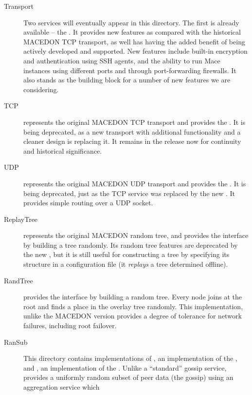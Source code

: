 \begin{description}
\item[Transport] Two  services will eventually
  appear in this directory.  The first is already available -- the .
  It provides new features as compared with the historical MACEDON TCP transport,
  as well has having the added benefit of being actively developed and supported.
  New features include built-in encryption and authentication using SSH agents, and 
  the ability to run Mace instances using different ports and through port-forwarding
  firewalls.  It also stands as the building block for a number of new features 
  we are considering.
\item[TCP]  represents the original MACEDON TCP transport and 
  provides the .  It is being deprecated, as a new 
  transport with additional functionality and a cleaner design is replacing it.
  It remains in the release now for continuity and historical significance.
\item[UDP]  represents the original MACEDON UDP transport and 
  provides the .  It is being deprecated, just as
  the TCP service was replaced by the new .  It
  provides simple routing over a UDP socket.
\item[ReplayTree]  represents the original MACEDON random tree,
  and provides the  interface by building a tree 
  randomly.  Its random tree features are deprecated by the new ,
  but it is still useful for constructing a tree by specifying its structure in
  a configuration file (it \emph{replays} a tree determined offline).
\item[RandTree]  provides the 
  interface by building a random tree.  Every node joins at the root and finds
  a place in the overlay tree randomly.  This implementation, unlike the MACEDON
  version provides a degree of tolerance for network failures, including root
  failover.
\item[RanSub] This directory contains implementations of ,
  an implementation of the , and
  , an implementation of the .
  Unlike a ``standard'' gossip service,  provides a uniformly
  random subset of peer data (the gossip) using an aggregation service which

\end{description}

